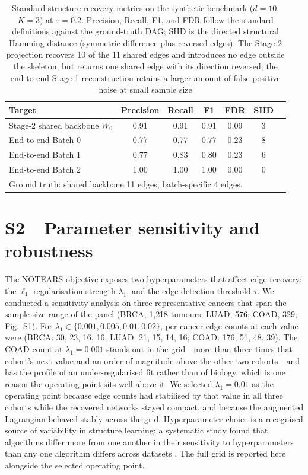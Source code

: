 \documentclass[11pt]{article}
\begin{document}
\begin{table}[htbp]
\centering
\caption{Standard structure-recovery metrics on the synthetic benchmark ($d=10$, $K=3$) at $\tau=0.2$. Precision, Recall, F1, and FDR follow the standard definitions against the ground-truth DAG; SHD is the directed structural Hamming distance (symmetric difference plus reversed edges). The Stage-2 projection recovers 10 of the 11 shared edges and introduces no edge outside the skeleton, but returns one shared edge with its direction reversed; the end-to-end Stage-1 reconstruction retains a larger amount of false-positive noise at small sample size}
\label{tab:synth_metrics}
\begin{tabular}{lcccccc}
\toprule
Target & Precision & Recall & F1 & FDR & SHD \\
\midrule
Stage-2 shared backbone $W_0$ & 0.91 & 0.91 & 0.91 & 0.09 & 3 \\
End-to-end Batch 0 & 0.77 & 0.77 & 0.77 & 0.23 & 8 \\
End-to-end Batch 1 & 0.77 & 0.83 & 0.80 & 0.23 & 6 \\
End-to-end Batch 2 & 1.00 & 1.00 & 1.00 & 0.00 & 0 \\
\midrule
\multicolumn{6}{l}{\small Ground truth: shared backbone 11 edges; batch-specific 4 edges.}\\
\bottomrule
\end{tabular}
\end{table}

\section*{S2\ \ Parameter sensitivity and robustness}

The NOTEARS objective exposes two hyperparameters that affect edge recovery: the $\ell_1$ regularisation strength $\lambda_1$, and the edge detection threshold $\tau$. We conducted a sensitivity analysis on three representative cancers that span the sample-size range of the panel (BRCA, 1{,}218 tumours; LUAD, 576; COAD, 329; Fig.~S1). For $\lambda_1 \in \{0.001, 0.005, 0.01, 0.02\}$, per-cancer edge counts at each value were (BRCA: 30, 23, 16, 16; LUAD: 21, 15, 14, 16; COAD: 176, 51, 48, 39). The COAD count at $\lambda_1 = 0.001$ stands out in the grid---more than three times that cohort's next value and an order of magnitude above the other two cohorts---and has the profile of an under-regularised fit rather than of biology, which is one reason the operating point sits well above it. We selected $\lambda_1 = 0.01$ as the operating point because edge counts had stabilised by that value in all three cohorts while the recovered networks stayed compact, and because the augmented Lagrangian behaved stably across the grid. Hyperparameter choice is a recognised source of variability in structure learning: a systematic study found that algorithms differ more from one another in their sensitivity to hyperparameters than any one algorithm differs across datasets \citep{machlanski2024robustness}. The full grid is reported here alongside the selected operating point.
\end{document}

